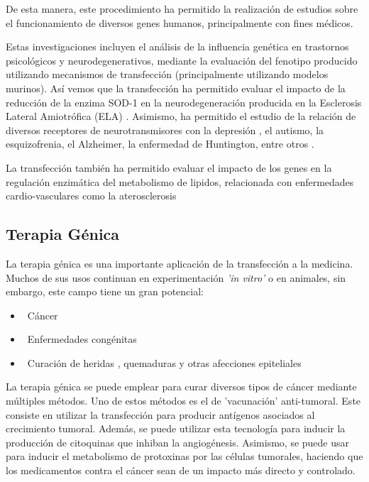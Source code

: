\documentclass[fleqn,10pt]{SelfArx} %
\begin{document}
De esta manera, este procedimiento ha permitido la realización de estudios sobre el funcionamiento de diversos genes humanos, principalmente con fines médicos.

Estas investigaciones incluyen el análisis de la influencia genética en trastornos psicológicos y neurodegenerativos, mediante la evaluación del fenotipo producido utilizando mecanismos de transfección (principalmente utilizando modelos murinos). Así vemos que la transfección ha permitido evaluar el impacto de la reducción de la enzima SOD-1 en la neurodegeneración producida en la Esclerosis Lateral Amiotrófica (ELA) \cite{ripps1995transgenic}. Asimismo, ha permitido el estudio de la relación de diversos receptores de neurotransmisores con la depresión \cite{cryanin2004}, el autismo, la esquizofrenia, el Alzheimer, la enfermedad de Huntington, entre otros \cite{anthe2002}.

La transfección también ha permitido evaluar el impacto de los genes en la regulación enzimática del metabolismo de lipidos, relacionada con enfermedades cardio-vasculares como la aterosclerosis\cite{yanni2004laboratory}


\subsection{Terapia Génica}

La terapia génica es una importante aplicación de la transfección a la medicina. Muchos de sus usos continuan en experimentación \textit{'in vitro'} o en animales, sin embargo, este campo tiene un gran potencial:
\begin{itemize}[noitemsep] %
\item \ Cáncer
\item \ Enfermedades congénitas
\item \ Curación de heridas , quemaduras y otras afecciones epiteliales
\end{itemize}

La terapia génica se puede emplear para curar diversos tipos de cáncer mediante múltiples métodos. Uno de estos métodos es el de 'vacunación' anti-tumoral. Este consiste en utilizar la transfección para producir antígenos asociados al crecimiento tumoral. Además, se puede utilizar esta tecnología para inducir la producción de citoquinas que inhiban la angiogénesis. Asimismo, se puede usar para inducir el metabolismo de protoxinas por las células tumorales, haciendo que los medicamentos contra el cáncer sean de un impacto más directo y controlado\cite{Vile, Seung}.
\end{document}
